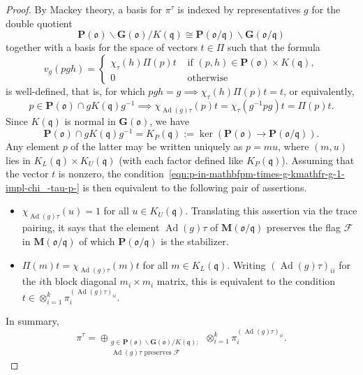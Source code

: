 \documentclass[reqno]{amsart}
\DeclareMathOperator{\Ad}{Ad}
\theoremstyle{plain} \newtheorem{theorem} {Theorem} \newtheorem{conjecture} {Conjecture} \newtheorem{corollary} [theorem] {Corollary} \newtheorem{proposition} [theorem] {Proposition} \newtheorem{fact} [theorem] {Fact}
\theoremstyle{definition} \newtheorem{definition} [theorem] {Definition}
\theoremstyle{itplain} %
\newcommand{\mfq}{\mathfrak{q}}
\begin{document}
\begin{proof}
  By Mackey theory, a basis for $\pi^\tau$ is indexed by representatives $g$ for the double quotient
  \begin{equation}\label{eqn:mathbfp-mathfr-backsl-mathbfgm--kmathfr-cong-mathb}
    \mathbf{P} (\mathfrak{o}) \backslash \mathbf{G}(\mathfrak{o}) / K(\mfq)
    \cong \mathbf{P}(\mathfrak{o}/\mfq) \backslash \mathbf{G}(\mathfrak{o}/\mfq)    
  \end{equation}
  together with a basis for the space of vectors $t \in \Pi$ such that the formula
  \begin{equation*}
    v_g (p g h) =
    \begin{cases}
      \chi_\tau(h) \Pi(p) t  & \text{ if } (p,h) \in \mathbf{P}(\mathfrak{o}) \times K(\mfq), \\
      0 & \text{ otherwise}
    \end{cases}
  \end{equation*}
  is well-defined, that is, for which $p g h = g \implies \chi_\tau(h) \Pi(p) t = t$, or equivalently,
  \begin{equation}\label{eqn:p-in-mathbfpm-times-g-kmathfr-g-1-impl-chi_-tau-p-}
    p \in \mathbf{P}(\mathfrak{o}) \cap  g K(\mfq) g^{-1}
    \implies
    \chi_{\Ad(g) \tau }(p) t = \chi_\tau(g^{-1} p g) t = \Pi(p) t.
  \end{equation}
  Since $K(\mfq)$ is normal in $\mathbf{G}(\mathfrak{o})$, we have
  \begin{equation*}
    \mathbf{P}(\mathfrak{o}) \cap g K(\mfq) g^{-1} = K_P(\mfq) := \ker (
    \mathbf{P}(\mathfrak{o}) \rightarrow \mathbf{P}(\mathfrak{o}/\mfq)
    ).
  \end{equation*}
  Any element $p$ of the latter may be written uniquely as $p = m u$, where $(m, u)$ lies in $K_L(\mfq) \times K_U(\mfq)$ (with each factor defined like $K_P(\mathfrak{q})$).  Assuming that the vector $t$ is nonzero, the condition~\eqref{eqn:p-in-mathbfpm-times-g-kmathfr-g-1-impl-chi_-tau-p-} is then equivalent to the following pair of assertions.
  \begin{itemize}
  \item $\chi_{\Ad(g) \tau}(u) = 1$ for all $u \in K_U(\mfq)$.  Translating this assertion via the trace pairing, it says that the element $\Ad(g) \tau$ of $\mathbf{M}(\mathfrak{o}/\mfq)$ preserves the flag $\mathcal{F}$ in $\mathbf{M}(\mathfrak{o}/\mfq)$ of which $\mathbf{P}(\mathfrak{o}/\mfq)$ is the stabilizer.
  \item $\Pi(m) t = \chi_{\Ad(g) \tau}(m) t$ for all $m \in K_L(\mfq)$.  Writing ${(\Ad(g) \tau )}_{ii}$ for the $i$th block diagonal $m_i \times m_i$ matrix, this is equivalent to the condition $t \in \otimes_{i=1}^k \pi_i^{{(\Ad(g) \tau)}_{i i}}$.
  \end{itemize}
  In summary,
  \begin{equation}\label{eqn:pitau--=-oplus_-subst-g-in-mathbfpm-backsl-mathbfg}
    \pi^{\tau } = \oplus_{
      \substack{
        g \in \mathbf{P}(\mathfrak{o}) \backslash \mathbf{G}(\mathfrak{o}) / K(\mfq) :  \\
        \Ad(g) \tau \text{ preserves } \mathcal{F} 
      }
    }
    \otimes_{i=1}^k \pi_i^{{(\Ad(g) \tau)}_{i i}}.
  \end{equation}


\end{proof}
\end{document}
